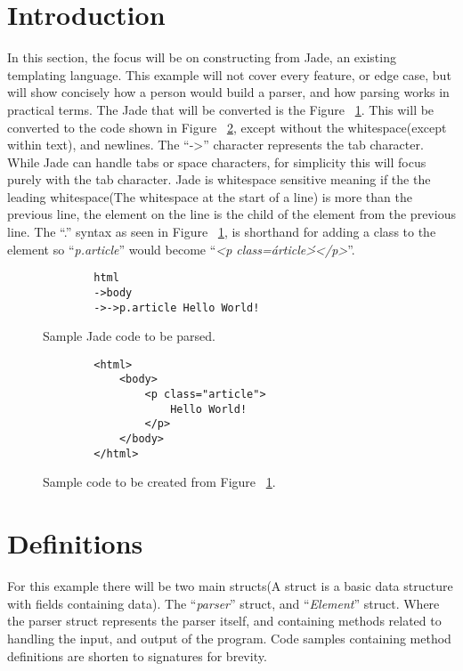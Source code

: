 \section{Introduction}
In this section, the focus will be on constructing  from Jade, an existing templating language. This example will not cover every feature, or edge case, but will show concisely how a person would build a parser, and how parsing works in practical terms. The Jade that will be converted is the Figure ~\ref{fig:jade}. This will be converted to the code shown in Figure ~\ref{fig:html}, except without the whitespace(except within text), and newlines. The ``->'' character represents the tab character. While Jade can handle tabs or space characters, for simplicity this will focus purely with the tab character. Jade is whitespace sensitive meaning if the the leading whitespace(The whitespace at the start of a line) is more than the previous line, the element on the line is the child of the element from the previous line. The ``.'' syntax as seen in Figure ~\ref{fig:jade}, is shorthand for adding a class to the element so ``\textit{p.article}'' would become ``\textit{<p class=\'article\'></p>}''.

\begin{figure}[ht!]
    \small
    \begin{verbatim}
        html
        ->body
        ->->p.article Hello World!
    \end{verbatim}
    \caption{Sample Jade code to be parsed.}
    \label{fig:jade}
\end{figure}

\begin{figure}[ht!]
    \small
    \begin{verbatim}
        <html>
            <body>
                <p class="article">
                    Hello World!
                </p>
            </body>
        </html>
    \end{verbatim}
    \caption{Sample  code to be created from Figure ~\ref{fig:jade}.}
    \label{fig:html}
\end{figure}

\section{Definitions}
For this example there will be two main structs(A struct is a basic data structure with fields containing data). The ``\textit{parser}'' struct, and ``\textit{Element}'' struct. Where the parser struct represents the parser itself, and containing methods related to handling the input, and output of the program. Code samples containing method definitions are shorten to signatures for brevity.

